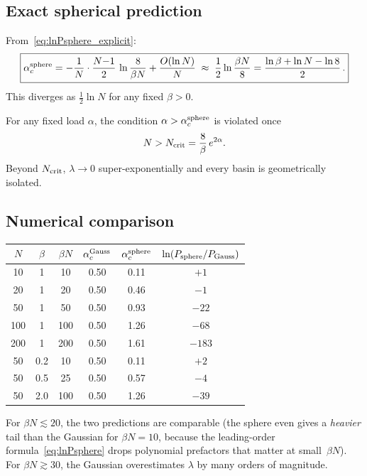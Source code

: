 \documentclass[11pt]{article}
\begin{document}
\subsection{Exact spherical prediction}

From~\eqref{eq:lnPsphere_explicit}:
\begin{equation}\label{eq:ac_sphere}
  \boxed{%
  \alpha_c^{\rm sphere}
  = -\frac{1}{N}\cdot\frac{N{-}1}{2}\,\ln\frac{8}{\beta N}
  + \frac{O(\ln N)}{N}
  \;\approx\;
  \frac{1}{2}\ln\frac{\beta N}{8}
  = \frac{\ln\beta + \ln N - \ln 8}{2}\,.}
\end{equation}
This diverges as $\tfrac{1}{2}\ln N$ for any fixed $\beta > 0$.

For any fixed load $\alpha$, the condition
$\alpha > \alpha_c^{\rm sphere}$ is violated once
\begin{equation}\label{eq:Ncrit}
  N > N_{\rm crit} = \frac{8}{\beta}\,e^{2\alpha}.
\end{equation}
Beyond $N_{\rm crit}$, $\lambda \to 0$ super-exponentially
and every basin is geometrically isolated.


\subsection{Numerical comparison}

\begin{center}
\begin{tabular}{cccccc}
\toprule
$N$ & $\beta$ & $\beta N$ &
  $\alpha_c^{\rm Gauss}$ &
  $\alpha_c^{\rm sphere}$ &
  $\ln(P_{\rm sphere}/P_{\rm Gauss})$ \\
\midrule
 10 & 1 &  10 & 0.50 & 0.11 & $+1$ \\
 20 & 1 &  20 & 0.50 & 0.46 & $-1$ \\
 50 & 1 &  50 & 0.50 & 0.93 & $-22$ \\
100 & 1 & 100 & 0.50 & 1.26 & $-68$ \\
200 & 1 & 200 & 0.50 & 1.61 & $-183$ \\
\midrule
 50 & 0.2 & 10 & 0.50 & 0.11 & $+2$ \\
 50 & 0.5 & 25 & 0.50 & 0.57 & $-4$ \\
 50 & 2.0 & 100 & 0.50 & 1.26 & $-39$ \\
\bottomrule
\end{tabular}
\end{center}

For $\beta N \lesssim 20$, the two predictions are comparable
(the sphere even gives a \emph{heavier} tail than the Gaussian
for $\beta N = 10$, because the leading-order
formula~\eqref{eq:lnPsphere} drops polynomial prefactors
that matter at small~$\beta N$).
For $\beta N \gtrsim 30$, the Gaussian overestimates
$\lambda$ by many orders of magnitude.
\end{document}
